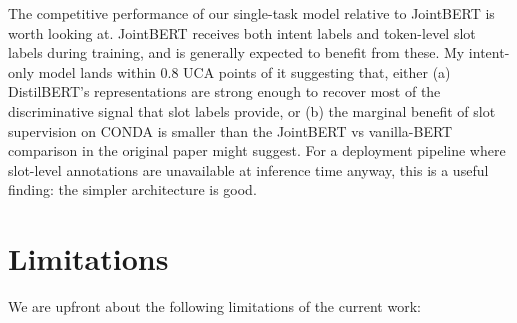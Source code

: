 \documentclass[a4paper,10.5pt,twoside]{article}
\begin{document}
The competitive performance of our single-task model relative to JointBERT is worth looking at. JointBERT receives both intent labels and token-level slot labels during training, and is generally expected to benefit from these. My intent-only model lands within 0.8 UCA points of it suggesting that, either (a) DistilBERT's representations are strong enough to recover most of the discriminative signal that slot labels provide, or (b) the marginal benefit of slot supervision on CONDA is smaller than the JointBERT vs vanilla-BERT comparison in the original paper might suggest. For a deployment pipeline where slot-level annotations are unavailable at inference time anyway, this is a useful finding: the simpler architecture is good.


\section{Limitations}\label{sec:limitations}

We are upfront about the following limitations of the current work:
\end{document}
